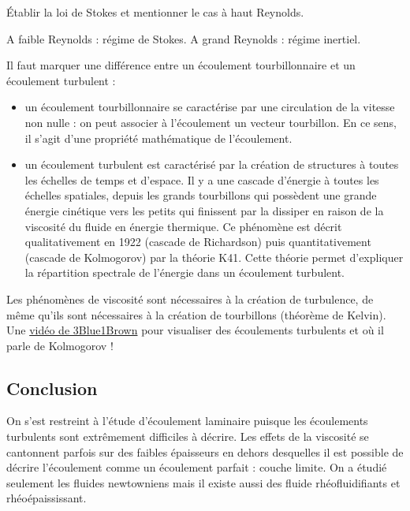 Établir la loi de Stokes et mentionner le cas à haut Reynolds.

\begin{remarque}
A faible Reynolds : régime de Stokes.
A grand Reynolds : régime inertiel.
\end{remarque}

\begin{remarque}
Il faut marquer une différence entre un écoulement tourbillonnaire et un écoulement turbulent :
\begin{itemize}
\item un écoulement tourbillonnaire se caractérise par une circulation de la vitesse non nulle : on peut associer à l'écoulement un vecteur tourbillon.
En ce sens, il s'agit d'une propriété mathématique de l'écoulement.
\item un écoulement turbulent est caractérisé par la création de structures à toutes les échelles de temps et d'espace.
Il y a une cascade d'énergie à toutes les échelles spatiales, depuis les grands tourbillons qui possèdent une grande énergie cinétique vers les petits qui finissent par la dissiper en raison de la viscosité du fluide en énergie thermique.
Ce phénomène est décrit qualitativement en 1922 (cascade de Richardson) puis quantitativement (cascade de Kolmogorov) par la théorie K41.
Cette théorie permet d'expliquer la répartition spectrale de l'énergie dans un écoulement turbulent.
\end{itemize}
Les phénomènes de viscosité sont nécessaires à la création de turbulence, de même qu'ils sont nécessaires à la création de tourbillons (théorème de Kelvin).
Une \href{https://www.youtube.com/watch?v=_UoTTq651dE}{vidéo de 3Blue1Brown} pour visualiser des écoulements turbulents et où il parle de Kolmogorov !
\end{remarque}

\subsection*{Conclusion}

On s'est restreint à l'étude d'écoulement laminaire puisque les écoulements turbulents sont extrêmement difficiles à décrire.
Les effets de la viscosité se cantonnent parfois sur des faibles épaisseurs en dehors desquelles il est possible de décrire l'écoulement comme un écoulement parfait : couche limite.
On a étudié seulement les fluides newtowniens mais il existe aussi des fluide rhéofluidifiants et rhéoépaississant.

\newpage